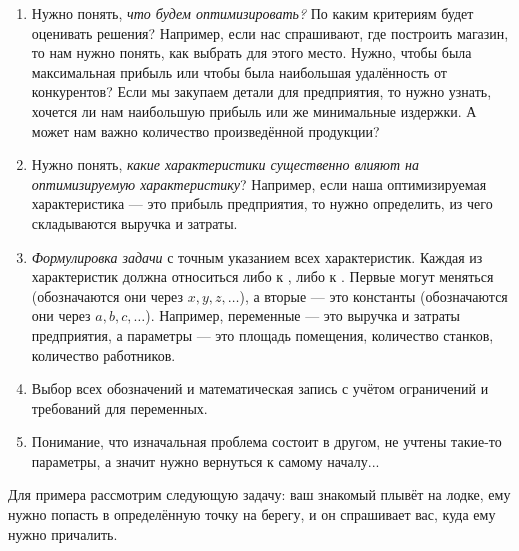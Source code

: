 \begin{enumerate}[nosep]
	\item Нужно понять, \textit{что будем оптимизировать?} По каким критериям будет оценивать решения? Например, если нас спрашивают, где построить магазин, то нам нужно понять, как выбрать для этого место. Нужно, чтобы была максимальная прибыль или чтобы была наибольшая удалённость от конкурентов? Если мы закупаем детали для предприятия, то нужно узнать, хочется ли нам наибольшую прибыль или же минимальные издержки. А может нам важно количество произведённой продукции?
	
	\item Нужно понять, \textit{какие характеристики существенно влияют на оптимизируемую характеристику}? Например, если наша оптимизируемая характеристика --- это прибыль предприятия, то нужно определить, из чего складываются выручка и затраты.
	
	\item \textit{Формулировка задачи} с точным указанием всех характеристик. Каждая из характеристик должна относиться либо к , либо к . Первые могут меняться (обозначаются они через $x, y, z, \dots$), а вторые --- это константы (обозначаются они через $a, b, c, \dots$). Например, переменные --- это выручка и затраты предприятия, а параметры --- это площадь помещения, количество станков, количество работников.
	
	\item Выбор всех обозначений и математическая запись с учётом ограничений и требований для переменных.
	
	\item Понимание, что изначальная проблема состоит в другом, не учтены такие-то параметры, а значит нужно вернуться к самому началу...
\end{enumerate}

\example

Для примера рассмотрим следующую задачу: ваш знакомый плывёт на лодке, ему нужно попасть в определённую точку на берегу, и он спрашивает вас, куда ему нужно причалить.

\begin{center}
\end{center}

